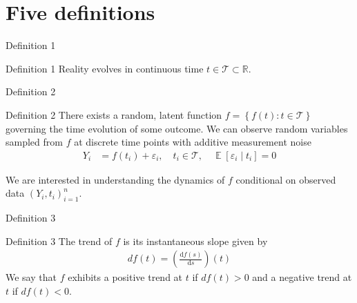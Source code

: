 \documentclass[ignorenonframetext,xcolor=pdflatex,table,dvipsnames,serif]{beamer}
\DeclareMathOperator{\E}{\mathbb{E}}
\begin{document}

\section{Five definitions}

\begin{frame}{Definition 1}
\begin{alertblock}{Definition 1}
  Reality evolves in continuous time $t \in \mathcal{T} \subset \mathbb{R}$.
\end{alertblock}  
\end{frame}


\begin{frame}{Definition 2}
\begin{alertblock}{Definition 2}
  There exists a random, latent function $f = \left\{f(t) : t \in \mathcal{T}\right\}$ governing the time evolution of some outcome. We can observe random variables sampled from $f$ at discrete time points with additive measurement noise
  \begin{align*}
	  Y_i &= f(t_i) + \varepsilon_i, \quad t_i \in \mathcal{T}, \quad \E[\varepsilon_i \mid t_i] = 0
  \end{align*}
  
  We are interested in understanding the dynamics of $f$ conditional on observed data $(Y_i, t_i)_{i=1}^{n}$.  
\end{alertblock}    
\end{frame}



\begin{frame}{Definition 3}
\begin{alertblock}{Definition 3}
  The \alert{trend} of $f$ is its instantaneous slope given by
  \begin{align*}
	  df(t) = \left(\frac{\mathrm{d} f(s)}{\mathrm{d}s}\right)(t)
  \end{align*}
  We say that $f$ exhibits a \alert{positive trend} at $t$ if $df(t) > 0$ and a \alert{negative trend} at $t$ if $df(t) < 0$.
\end{alertblock}    
\end{frame}
\end{document}
